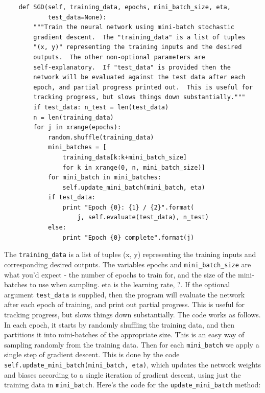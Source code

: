 \begin{lstlisting}
    def SGD(self, training_data, epochs, mini_batch_size, eta,
            test_data=None):
        """Train the neural network using mini-batch stochastic
        gradient descent.  The "training_data" is a list of tuples
        "(x, y)" representing the training inputs and the desired
        outputs.  The other non-optional parameters are
        self-explanatory.  If "test_data" is provided then the
        network will be evaluated against the test data after each
        epoch, and partial progress printed out.  This is useful for
        tracking progress, but slows things down substantially."""
        if test_data: n_test = len(test_data)
        n = len(training_data)
        for j in xrange(epochs):
            random.shuffle(training_data)
            mini_batches = [
                training_data[k:k+mini_batch_size]
                for k in xrange(0, n, mini_batch_size)]
            for mini_batch in mini_batches:
                self.update_mini_batch(mini_batch, eta)
            if test_data:
                print "Epoch {0}: {1} / {2}".format(
                    j, self.evaluate(test_data), n_test)
            else:
                print "Epoch {0} complete".format(j)
\end{lstlisting}
                
The \lstinline{training_data} is a list of tuples (x, y) representing the training inputs and corresponding desired outputs. The variables epochs and \lstinline{mini_batch_size} are what you'd expect - the number of epochs to train for, and the size of the mini-batches to use when sampling. eta is the learning rate, ?. If the optional argument \lstinline{test_data} is supplied, then the program will evaluate the network after each epoch of training, and print out partial progress. This is useful for tracking progress, but slows things down substantially.
The code works as follows. In each epoch, it starts by randomly shuffling the training data, and then partitions it into mini-batches of the appropriate size. This is an easy way of sampling randomly from the training data. Then for each \lstinline{mini_batch} we apply a single step of gradient descent. This is done by the code \lstinline{self.update_mini_batch(mini_batch, eta)}, which updates the network weights and biases according to a single iteration of gradient descent, using just the training data in \lstinline{mini_batch}. Here's the code for the \lstinline{update_mini_batch} method: 

